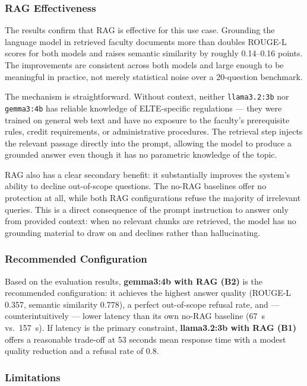 \subsubsection*{RAG Effectiveness}
 
The results confirm that RAG is effective for this use case. Grounding the
language model in retrieved faculty documents more than doubles ROUGE-L scores
for both models and raises semantic similarity by roughly 0.14--0.16 points.
The improvements are consistent across both models and large enough to be
meaningful in practice, not merely statistical noise over a 20-question
benchmark.
 
The mechanism is straightforward. Without context, neither \texttt{llama3.2:3b}
nor \texttt{gemma3:4b} has reliable knowledge of ELTE-specific regulations ---
they were trained on general web text and have no exposure to the faculty's
prerequisite rules, credit requirements, or administrative procedures. The
retrieval step injects the relevant passage directly into the prompt, allowing
the model to produce a grounded answer even though it has no parametric
knowledge of the topic.
 
RAG also has a clear secondary benefit: it substantially improves the system's
ability to decline out-of-scope questions. The no-RAG baselines offer no
protection at all, while both RAG configurations refuse the majority of
irrelevant queries. This is a direct consequence of the prompt instruction to
answer only from provided context: when no relevant chunks are retrieved, the
model has no grounding material to draw on and declines rather than
hallucinating.
 
\subsubsection*{Recommended Configuration}
 
Based on the evaluation results, \textbf{gemma3:4b with RAG (B2)} is the
recommended configuration: it achieves the highest answer quality (ROUGE-L
0.357, semantic similarity 0.778), a perfect out-of-scope refusal rate, and
--- counterintuitively --- lower latency than its own no-RAG baseline (67~s
vs.\ 157~s). If latency is the primary constraint,
\textbf{llama3.2:3b with RAG (B1)} offers a reasonable trade-off at 53 seconds
mean response time with a modest quality reduction and a refusal rate of 0.8.
 
\subsubsection*{Limitations}
 
